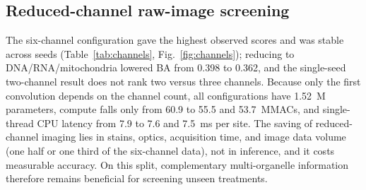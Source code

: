 \documentclass[conference]{IEEEtran}
\begin{document}
\begin{table}[t]
\caption{Treatment-held-out BA under experiment shift (train on one HUVEC experiment, test on the other). $\Delta$: paired gain over raw embeddings from label-free centering on all sites or on control (EMPTY) sites of each experiment, with 95\% treatment-level CI. LR: Logistic; XGB: unweighted XGBoost. $^{\circ}$CI includes zero.}
\label{tab:shift}
\centering
\setlength{\tabcolsep}{3pt}
\end{table}

\subsection{Reduced-channel raw-image screening}
The six-channel configuration gave the highest observed scores and was stable across seeds (Table~\ref{tab:channels}, Fig.~\ref{fig:channels}); reducing to DNA/RNA/mitochondria lowered BA from 0.398 to 0.362, and the single-seed two-channel result does not rank two versus three channels. Because only the first convolution depends on the channel count, all configurations have 1.52~M parameters, compute falls only from 60.9 to 55.5 and 53.7~MMACs, and single-thread CPU latency from 7.9 to 7.6 and 7.5~ms per site. The saving of reduced-channel imaging lies in stains, optics, acquisition time, and image data volume (one half or one third of the six-channel data), not in inference, and it costs measurable accuracy. On this split, complementary multi-organelle information therefore remains beneficial for screening unseen treatments.
\end{document}
